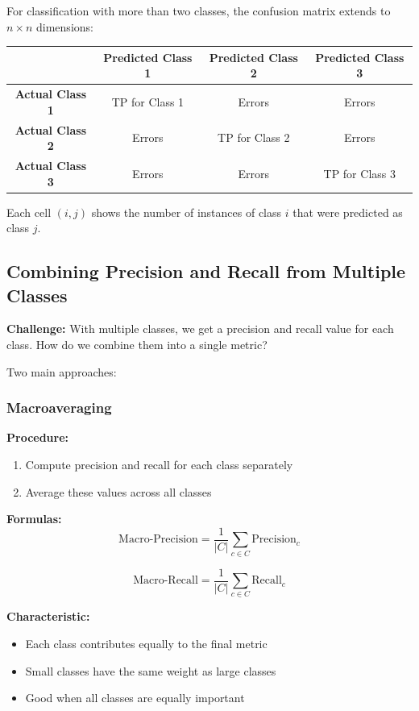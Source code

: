 \documentclass[11pt,a4paper]{article}
\theoremstyle{definition}
\theoremstyle{plain}
\theoremstyle{remark}
\begin{document}
For classification with more than two classes, the confusion matrix extends to $n \times n$ dimensions:

\begin{center}
\begin{tabular}{|c|c|c|c|}
\hline
 & \textbf{Predicted Class 1} & \textbf{Predicted Class 2} & \textbf{Predicted Class 3} \\
\hline
\textbf{Actual Class 1} & TP for Class 1 & Errors & Errors \\
\hline
\textbf{Actual Class 2} & Errors & TP for Class 2 & Errors \\
\hline
\textbf{Actual Class 3} & Errors & Errors & TP for Class 3 \\
\hline
\end{tabular}
\end{center}

Each cell $(i,j)$ shows the number of instances of class $i$ that were predicted as class $j$.

\subsection{Combining Precision and Recall from Multiple Classes}

\textbf{Challenge:} With multiple classes, we get a precision and recall value for each class. How do we combine them into a single metric?

Two main approaches:

\subsubsection{Macroaveraging}

\textbf{Procedure:}
\begin{enumerate}
    \item Compute precision and recall for each class separately
    \item Average these values across all classes
\end{enumerate}

\textbf{Formulas:}
\[
\text{Macro-Precision} = \frac{1}{|C|} \sum_{c \in C} \text{Precision}_c
\]

\[
\text{Macro-Recall} = \frac{1}{|C|} \sum_{c \in C} \text{Recall}_c
\]

\textbf{Characteristic:}
\begin{itemize}
    \item Each class contributes equally to the final metric
    \item Small classes have the same weight as large classes
    \item Good when all classes are equally important
\end{itemize}
\end{document}

